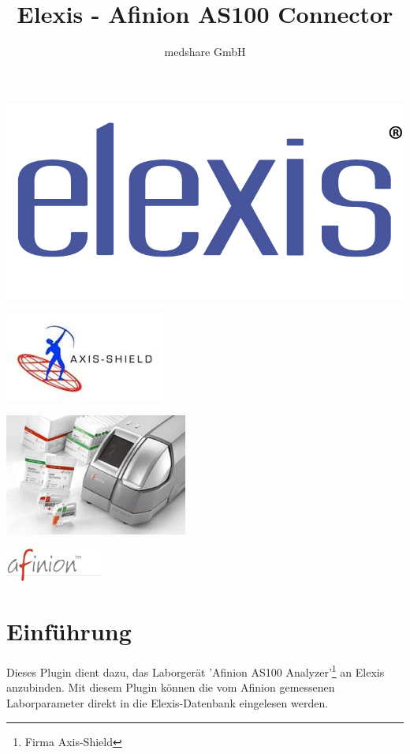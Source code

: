\documentclass[a4paper]{scrartcl}
\title{Elexis - Afinion AS100 Connector}
\author{medshare GmbH}
\begin{document}
\maketitle
	\begin{center}
		\includegraphics{elexis_logo}
	\end{center}
	\begin{center}
		\includegraphics{axis-shield_logo}
	\end{center}
	\begin{center}
		\includegraphics{afinion_device}
	\end{center}
	\begin{center}
		\includegraphics{afinion_logo}
	\end{center}
\pagebreak

\section{Einf\"uhrung}
Dieses Plugin dient dazu, das Laborger\"at 'Afinion AS100 Analyzer'\footnote{Firma Axis-Shield} an Elexis anzubinden. Mit diesem Plugin k\"onnen die vom Afinion gemessenen Laborparameter direkt in die Elexis-Datenbank eingelesen werden.
\end{document}
